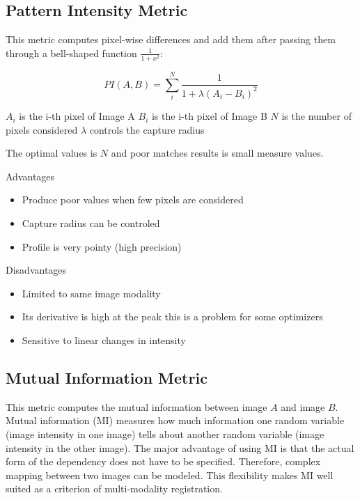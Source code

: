 \subsection{Pattern Intensity Metric}
\label{sec:PatternIntensityMetric}
This metric computes pixel-wise differences and add them 
after passing them through a bell-shaped function $\frac{1}{1+x^2}$:

\begin{equation}
PI(A,B) =  \sum_i^N \frac{ 1 }{ 1 + \lambda \left( A_i - B_i \right) ^ 2 }
\end{equation}
\begin{center}
$A_i$ is the i-th pixel of Image A 
$B_i$ is the i-th pixel of Image B
$N$ is the number of pixels considered
$\lambda$ controls the capture radius
\end{center}

The optimal values is $N$ and poor matches results is small measure
values.

Advantages
\begin{itemize}
\item Produce poor values when few pixels are considered
\item Capture radius can be controled
\item Profile is very pointy (high precision)
\end{itemize}

Disadvantages
\begin{itemize}
\item Limited to same image modality
\item Its derivative is high at the peak this is a problem for some optimizers
\item Sensitive to linear changes in intensity
\end{itemize}


\subsection{Mutual Information Metric}
\label{sec:MutualInformationMetric}
This metric computes the mutual information between image $A$ and image $B$.
Mutual information (MI) measures how much information one random variable
(image intensity in one image) tells about another random variable 
(image intensity in the other image). The major advantage of using
MI is that the actual form of the dependency does not have to be specified. 
Therefore, complex mapping between two images can be modeled. 
This flexibility makes MI well suited as a criterion of multi-modality
registration.

